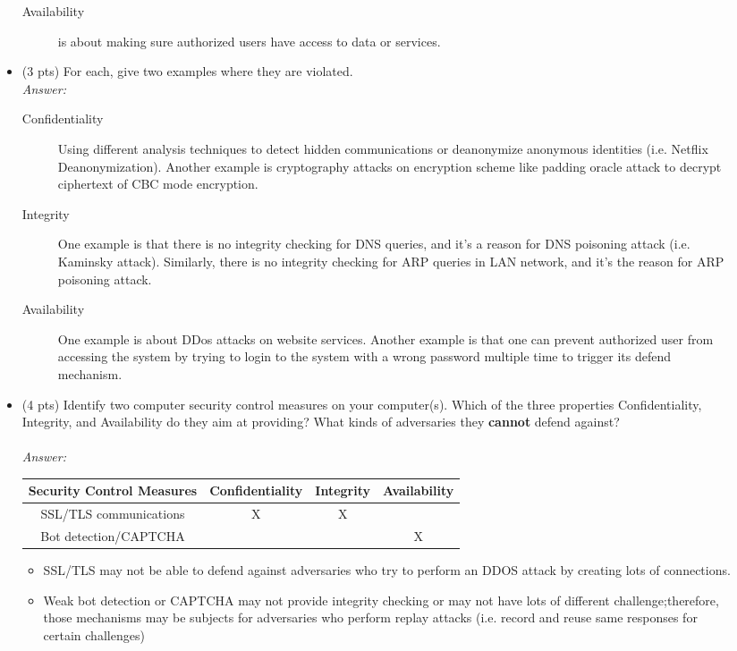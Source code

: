 \documentclass[11pt]{article}
\begin{document}
\begin{description}
\begin{itemize}
\begin{description}
	\item[Availability] is about making sure authorized users have access to data or services.
\end{description}
\item (3 pts)
For each, give two examples where they are violated.
\\
\textit{Answer:}
	\begin{description}
	\item[Confidentiality] Using different analysis techniques to detect hidden communications or deanonymize anonymous identities (i.e. Netflix Deanonymization). Another example is cryptography attacks on encryption scheme like padding oracle attack to decrypt ciphertext of CBC mode encryption. 
	\item[Integrity] One example is that there is no integrity checking for DNS queries, and it's a reason for DNS poisoning attack (i.e. Kaminsky attack). Similarly, there is no integrity checking for ARP queries in LAN network, and it's the reason for ARP poisoning attack.
	\item[Availability] One example is about DDos attacks on website services. Another example is that one can prevent authorized user from accessing the system by trying to login to the system with a wrong password multiple time to trigger its defend mechanism. 
	\end{description}
\item (4 pts)
Identify two computer security control measures on your computer(s).  Which of the
three properties Confidentiality, Integrity, and Availability do they aim at
providing? What kinds of adversaries they \textbf{cannot} defend against?\\
\\
\textit{Answer:}\\
\begin{tabular}{|c|c|c|c|}
	\hline Security Control Measures & Confidentiality & Integrity & Availability \\
    \hline SSL/TLS communications    &        X        &     X     &              \\
 	\hline Bot detection/CAPTCHA     &                 &           &       X      \\
 	\hline
\end{tabular}
\begin{itemize}
	\item SSL/TLS may not be able to defend against adversaries who try to perform an DDOS attack by creating lots of connections. 
	\item Weak bot detection or CAPTCHA may not provide integrity checking or may not have lots of different challenge;therefore, those mechanisms may be subjects for adversaries who perform replay attacks (i.e. record and reuse same responses for certain challenges) 
\end{itemize}
\end{itemize}


\end{description}
\end{document}

